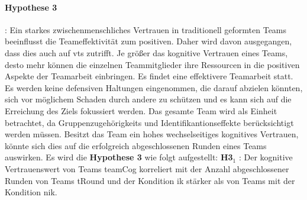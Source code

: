 \documentclass[a4paper,11pt]{article}%
\renewcommand{\\}{\vspace*{0.5\baselineskip} \newline}
\begin{document}

\newpage
\paragraph{Hypothese 3}:
%
Ein starkes zwischenmenschliches Vertrauen in traditionell geformten Teams beeinflusst die Teameffektivität zum positiven. Daher wird davon ausgegangen, dass dies auch auf \ac{vts} zutrifft. 
Je größer das kognitive Vertrauen eines Teams, desto mehr können die einzelnen Teammitglieder ihre Ressourcen in die positiven Aspekte der Teamarbeit einbringen. Es findet eine effektivere Teamarbeit statt. Es werden keine defensiven Haltungen eingenommen, die darauf abzielen könnten, sich vor möglichem Schaden durch andere zu schützen und es kann sich auf die Erreichung des Ziels fokussiert werden. 
Das gesamte Team wird als Einheit betrachtet, da Gruppenzugehörigkeits und Identifikantionseffekte berücksichtigt werden müssen. Besitzt das Team ein hohes wechselseitiges kognitives Vertrauen, könnte sich dies auf die erfolgreich abgeschlossenen Runden eines Teams auswirken. 
Es wird die \textbf{Hypothese 3} wie folgt aufgestellt:\\
\textbf{H3$_{1}$} : Der kognitive Vertrauenswert von Teams \ac{teamCog} korreliert mit der Anzahl abgeschlossener Runden von Teams \ac{tRound} und der Kondition \ac{ik} stärker als von Teams mit der Kondition \ac{nik}. \newline
\end{document}
